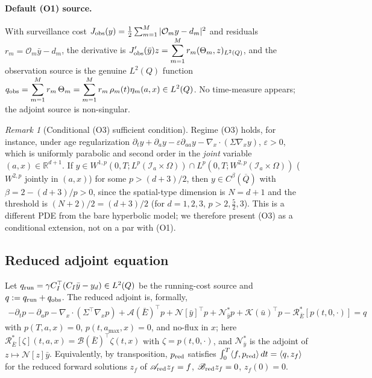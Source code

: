 \documentclass[pdflatex,sn-mathphys-num]{sn-jnl}
\theoremstyle{plain}
\theoremstyle{definition}
\theoremstyle{remark}
\newtheorem{remark}[theorem]{Remark}
\newcommand{\R}{\mathbb R}
\begin{document}
\paragraph{Default (O1) source.}
With surveillance cost
$J_{\rm obs}(y)=\tfrac12\sum_{m=1}^M|\mathcal O_m y-d_m|^2$ and residuals
$r_m=\mathcal O_m\bar y-d_m$, the derivative is
$\displaystyle J_{\rm obs}'(\bar y)z
=
\sum_{m=1}^M r_m(\Theta_m,z)_{L^2(Q)}$,
and the observation source is the genuine $L^2(Q)$ function
$\displaystyle q_{\rm obs}
=
\sum_{m=1}^M r_m\,\Theta_m
=
\sum_{m=1}^M r_m\,\rho_m(t)\eta_m(a,x)\in L^2(Q)$.
No time-measure appears; the adjoint source is non-singular.

\begin{remark}[Conditional (O3) sufficient condition]
\label{rem:point-sufficient}
Regime (O3) holds, for instance, under age regularization
$\partial_t y+\partial_a y-\varepsilon\partial_{aa}y-\nabla_x\cdot(\Sigma
\nabla_x y)$, $\varepsilon>0$, which is uniformly parabolic and second order in
the \emph{joint} variable $(a,x)\in\R^{d+1}$. If
$y\in W^{1,p}(0,T;L^p(\mathcal I_a\times\Omega))\cap  L^p(0,T;W^{2,p}(\mathcal I_a\times\Omega))$
($W^{2,p}$ jointly in $(a,x)$) for some $p>(d+3)/2$, then
$y\in C^\beta(\overline Q)$ with $\beta=2-(d+3)/p>0$, since the spatial-type
dimension is $N=d+1$ and the threshold is $(N+2)/2=(d+3)/2$ (for $d=1,2,3$,
$p>2,\tfrac52,3$). This is a different PDE from the bare hyperbolic model; we
therefore present (O3) as a conditional extension, not on a par with (O1).
\end{remark}

\subsection{Reduced adjoint equation}
\label{subsec:reduced-adjoint}
Let $q_{\rm run}=\gamma C_I^\top(C_I\bar y-y_d)\in L^2(Q)$ be the running-cost
source and $q:=q_{\rm run}+q_{\rm obs}$. The reduced adjoint is, formally,
\begin{multline}
\label{eq:formal-reduced-adjoint}
-\partial_t p-\partial_a p
-\nabla_x\cdot(\Sigma^\top\nabla_x p)
+
\mathcal A(\bar E)^\top p
+
\mathcal N[\bar y]^\top p
+
\mathcal N_{\bar y}^*p
+
\mathcal K(\bar u)^\top p
-
\mathcal R_{\bar E}^*[p(t,0,\cdot)]
=
q
\end{multline}
with $p(T,a,x)=0$, $p(t,a_{\max},x)=0$, and no-flux in $x$; here
$\mathcal R_{\bar E}^*[\zeta](t,a,x)=\mathcal B(\bar E)^\top\zeta(t,x)$ with
$\zeta=p(t,0,\cdot)$, and $\mathcal N_{\bar y}^*$ is the adjoint of
$z\mapsto\mathcal N[z]\bar y$. Equivalently, by transposition, $p_{\rm red}$
satisfies $\int_0^T\langle f,p_{\rm red}\rangle\,dt=\langle q,z_f\rangle$ for
the reduced forward solutions $z_f$ of $\mathscr A_{\rm red}z_f=f$,
$\mathscr B_{\rm red}z_f=0$, $z_f(0)=0$.
\end{document}
